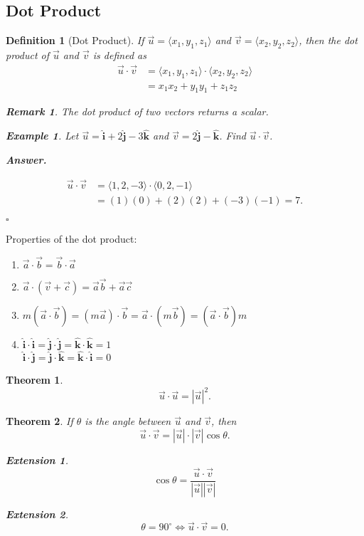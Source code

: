 \documentclass[12pt,a4paper]{article}
\newtheorem{thm}{Theorem}[subsection]
\newtheorem{df}{Definition}[subsection]
\newtheorem{eg}{Example}[subsection]
\newenvironment*{ans}{\par\indent\textbf{\textit{Answer. }}\par}{\par\hfill{$\square$}\par}
\newtheorem*{rmk}{\indent Remark}
\newtheorem*{ext}{\indent Extension}
\def\vecv{\vec{v}}
\def\vecu{\vec{u}}
\def\veca{\vec{a}}
\def\vecb{\vec{b}}
\def\vecc{\vec{c}}
\def\veci{\hat{\boldsymbol{\textbf{i}}}}
\def\vecj{\hat{\boldsymbol{\textbf{j}}}}
\def\veck{\hat{\boldsymbol{\textbf{k}}}}
\begin{document}
\subsection{Dot Product}
\begin{df}[Dot Product]
	If $\vecu=\langle x_1,y_1,z_1\rangle$ and $\vecv=\langle x_2,y_2,z_2\rangle$, then the dot product of $\vecu$ and $\vecv$ is defined as \[\begin{aligned}
		\vecu\cdot\vecv&=\langle x_1,y_1,z_1\rangle\cdot\langle x_2,y_2,z_2\rangle\\
		&=x_1x_2+y_1y_1+z_1z_2 
	\end{aligned}\]	
	\begin{rmk} The dot product of two vectors returns a scalar. \end{rmk}
	\begin{eg}
		Let $\vecu=\veci+2\vecj-3\veck$ and $\vecv=2\vecj-\veck$. Find $\vecu\cdot\vecv$.
		\begin{ans}
			\[\begin{aligned}
			\vecu\cdot\vecv&=\langle1,2,-3\rangle\cdot\langle0,2,-1\rangle\\
				&=(1)(0)+(2)(2)+(-3)(-1)=7.
			\end{aligned}\]	
		\end{ans}
	\end{eg}
\end{df}
Properties of the dot product: 
\begin{enumerate}
	\item $\veca\cdot\vecb=\vecb\cdot\veca$
	\item $\veca\cdot(\vecv+\vecc)=\veca\vecb+\veca\vecc$
	\item $m(\veca\cdot\vecb)=(m\veca)\cdot\vecb=\veca\cdot(m\vecb)=(\veca\cdot\vecb)m$
	\item $\veci\cdot\veci=\vecj\cdot\vecj=\veck\cdot\veck=1$\\$\veci\cdot\vecj=\vecj\cdot\veck=\veck\cdot\veci=0$
\end{enumerate}
\begin{thm}
	\[\vecu\cdot\vecu=|\vecu|^2.\]	
\end{thm}
\begin{thm}
	If $\theta$ is the angle between $\vecu$ and $\vecv$, then \[\boxed{\vecu\cdot\vecv=|\vecu|\cdot|\vecv|\cos\theta}.\]
	\begin{ext} \[\cos\theta=\frac{\vecu\cdot\vecv}{|\vecu||\vecv|}\]\end{ext}
	\begin{ext} \[\theta=90^\circ\Longleftrightarrow\vecu\cdot\vecv=0.\]	\end{ext}
\end{thm}
\end{document}
